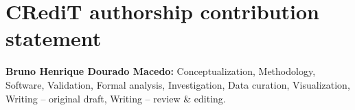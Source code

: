 \section*{CRediT authorship contribution statement}
\textbf{Bruno Henrique Dourado Macedo:} Conceptualization, Methodology, Software, Validation, Formal analysis, Investigation, Data curation, Visualization, Writing – original draft, Writing – review \& editing.
